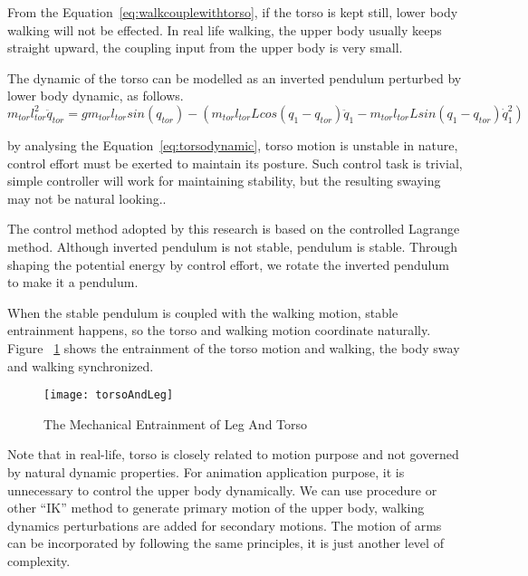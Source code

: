{From the Equation~\ref{eq:walkcouplewithtorso}, if the torso is kept still, lower body walking will not be effected.
In real life walking, the upper body usually keeps straight upward, the coupling input from the upper body is very small.



The dynamic of the torso can be modelled as an inverted pendulum perturbed by lower body dynamic, as follows.
\begin{equation}
\label{eq:torsodynamic}
m_{tor}l_{tor}^{2}\ddot{q}_{tor}=gm_{tor}l_{tor}sin(q_{tor})-(m_{tor}l_{tor}Lcos(q_{1}-q_{tor})\ddot{q}_{1}-m_{tor}l_{tor}Lsin(q_{1}-q_{tor})\dot{q}_{1}^{2})
\end{equation}

by analysing the Equation~\ref{eq:torsodynamic},  torso motion is unstable in nature,  control effort must be exerted to maintain its posture.
Such control task is trivial, simple \pd controller will work for maintaining stability, but the resulting swaying may not be natural looking..

The control method adopted by this research is based on the controlled Lagrange method.
Although inverted pendulum is not stable, pendulum is stable.
Through shaping the potential energy by control effort, we  rotate the inverted pendulum to make it a pendulum.

When the stable pendulum is coupled with the walking motion, stable entrainment happens, so the torso and walking motion coordinate naturally. 
Figure ~\ref{fig:torsolegentrainment} shows the entrainment of the torso motion and walking, the body sway and walking synchronized.
\begin{figure}[!htbp]
  \begin{center}
      \texttt{[image: torsoAndLeg]}
    \caption{The Mechanical Entrainment of Leg And Torso}
    \label{fig:torsolegentrainment}
\end{center}
\end{figure}




Note that in real-life, torso is closely related to motion purpose and not governed by natural dynamic properties.
For animation application purpose,  it is unnecessary to control the upper body dynamically.
We can use procedure or other ``IK'' method to generate primary  motion of the upper body, walking dynamics perturbations are added for secondary motions.
The motion of arms can be incorporated by following the same principles, it is just another level of complexity.


}
